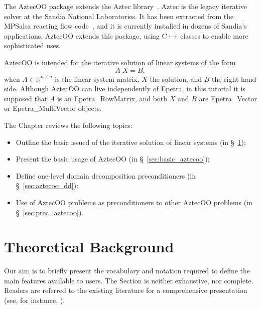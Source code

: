 \begin{introchapter}
The AztecOO \cite{AztecOO-Users-Guide} package extends the Aztec library~\cite{Aztec2.1}.
Aztec is the legacy iterative solver at the Sandia National
Laboratories.  It has been extracted from the MPSalsa reacting flow
code~\cite{MPSalsa-Theory,MPSalsa-User-Guide}, and it is currently
installed in dozens of Sandia's applications. AztecOO extends this
package, using C++ classes to enable more sophisticated uses.

AztecOO is intended for the iterative solution of linear systems of the form
\begin{equation}
  \label{eq:linear_sys}
  A \; X = B ,
\end{equation}
when $A \in \mathbb{R}^{n \times n}$ is the linear system matrix, $X$
the solution, and $B$ the right-hand side. Although AztecOO can live
independently of Epetra, in this tutorial it is supposed that $A$ is an
Epetra\_RowMatrix, and both $X$ and $B$ are Epetra\_Vector or
Epetra\_MultiVector objects.

The Chapter reviews the following topics:
\begin{itemize}
\item Outline the basic issued of the iterative solution of linear
  systems (in \S~\ref{aztecoo:theoretical});
\item Present the basic usage of AztecOO (in
  \S~\ref{sec:basic_aztecoo});
\item Define one-level domain decomposition preconditioners (in
  \S~\ref{sec:aztecoo_dd});
\item Use of AztecOO problems as preconditioners to other AztecOO
  problems (in \S~\ref{sec:prec_aztecoo}).
\end{itemize}
\end{introchapter}


\section{Theoretical Background}
\label{aztecoo:theoretical}

Our aim is to briefly present the vocabulary and notation 
required to define the main features available to users.
The Section is neither exhaustive, nor complete. Readers are
referred to the existing literature for a comprehensive presentation (see,
for instance, \cite{temp94,axelsson94iterative,saad96iterative}).

\medskip

